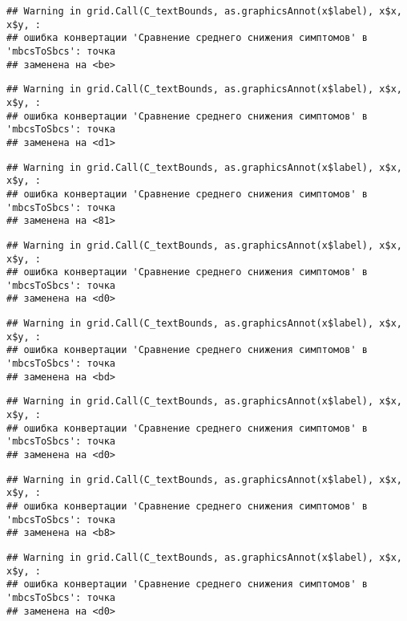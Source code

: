 \documentclass[
]{article}
\begin{document}
\begin{verbatim}
## Warning in grid.Call(C_textBounds, as.graphicsAnnot(x$label), x$x, x$y, :
## ошибка конвертации 'Сравнение среднего снижения симптомов' в 'mbcsToSbcs': точка
## заменена на <be>
\end{verbatim}

\begin{verbatim}
## Warning in grid.Call(C_textBounds, as.graphicsAnnot(x$label), x$x, x$y, :
## ошибка конвертации 'Сравнение среднего снижения симптомов' в 'mbcsToSbcs': точка
## заменена на <d1>
\end{verbatim}

\begin{verbatim}
## Warning in grid.Call(C_textBounds, as.graphicsAnnot(x$label), x$x, x$y, :
## ошибка конвертации 'Сравнение среднего снижения симптомов' в 'mbcsToSbcs': точка
## заменена на <81>
\end{verbatim}

\begin{verbatim}
## Warning in grid.Call(C_textBounds, as.graphicsAnnot(x$label), x$x, x$y, :
## ошибка конвертации 'Сравнение среднего снижения симптомов' в 'mbcsToSbcs': точка
## заменена на <d0>
\end{verbatim}

\begin{verbatim}
## Warning in grid.Call(C_textBounds, as.graphicsAnnot(x$label), x$x, x$y, :
## ошибка конвертации 'Сравнение среднего снижения симптомов' в 'mbcsToSbcs': точка
## заменена на <bd>
\end{verbatim}

\begin{verbatim}
## Warning in grid.Call(C_textBounds, as.graphicsAnnot(x$label), x$x, x$y, :
## ошибка конвертации 'Сравнение среднего снижения симптомов' в 'mbcsToSbcs': точка
## заменена на <d0>
\end{verbatim}

\begin{verbatim}
## Warning in grid.Call(C_textBounds, as.graphicsAnnot(x$label), x$x, x$y, :
## ошибка конвертации 'Сравнение среднего снижения симптомов' в 'mbcsToSbcs': точка
## заменена на <b8>
\end{verbatim}

\begin{verbatim}
## Warning in grid.Call(C_textBounds, as.graphicsAnnot(x$label), x$x, x$y, :
## ошибка конвертации 'Сравнение среднего снижения симптомов' в 'mbcsToSbcs': точка
## заменена на <d0>
\end{verbatim}
\end{document}
